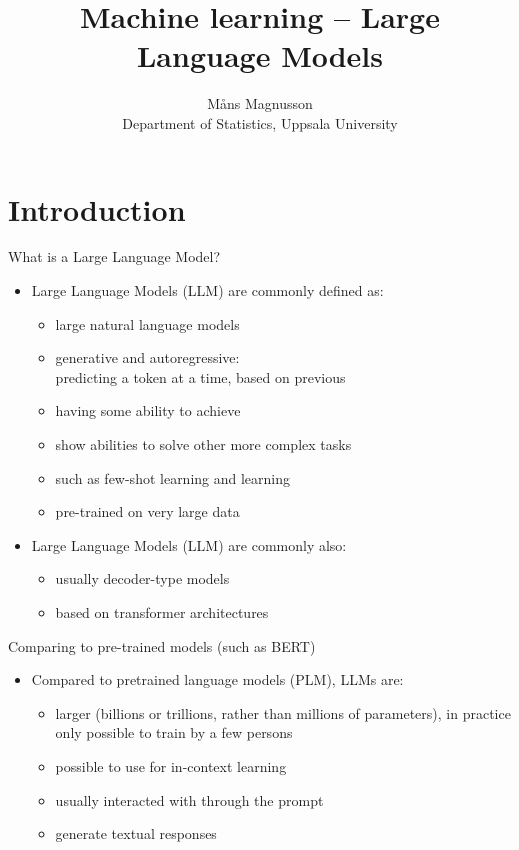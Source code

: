 \documentclass[10pt]{beamer}
\title[]{{\color{black}Machine learning -- Large Language Models}}
\author[]{M{\aa}ns Magnusson\\Department of Statistics, Uppsala University}
\date{\currentsemester}
\begin{document}
\frame{\titlepage
}





\section{Introduction} %

\begin{frame}{What is a Large Language Model?}

\begin{itemize}
  \item Large Language Models (LLM) are commonly defined as:
  \begin{itemize}
      \item large natural language models
      \pause
      \item generative and autoregressive:
      \\predicting a token at a time, based on previous 
      \pause
      \item having some ability to achieve 
      \item show  abilities to solve other more complex tasks
      \item such as few-shot learning and  learning
      \pause
      \item pre-trained on very large data
  \end{itemize}
  \item Large Language Models (LLM) are commonly also:
  \begin{itemize}
    \item usually decoder-type models
    \pause
    \item based on transformer architectures
  \end{itemize}
\end{itemize}

\end{frame}

\begin{frame}{Comparing to pre-trained models (such as BERT)}

\begin{itemize}
  \item Compared to pretrained language models (PLM), LLMs are:
  \begin{itemize}
      \item larger (billions or trillions, rather than millions of parameters), in practice only possible to train by a few persons
      \item possible to use for in-context learning
      \item usually interacted with through the prompt
      \item generate textual responses
  \end{itemize}
\end{itemize}

\end{frame}
\end{document}
